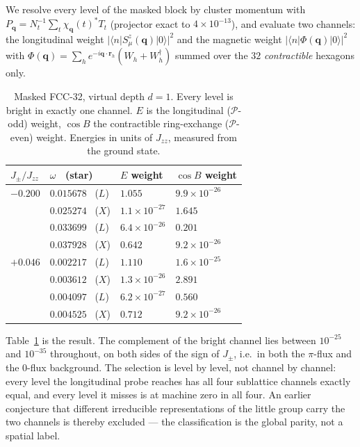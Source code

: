 \documentclass[aps,prl,preprint,amsmath,amssymb,superscriptaddress,
longbibliography,floatfix]{revtex4-2}
\newcommand{\Jzz}{J_{zz}}
\newcommand{\Jpm}{J_{\pm}}
\DeclareRobustCommand{\bq}{\bm q}
\DeclareRobustCommand{\br}{\bm r}
\newcommand{\PP}{\mathcal{P}}
\begin{document}
We resolve every level of the masked block by cluster momentum with
$P_{\bq}=N_t^{-1}\sum_t\chi_{\bq}(t)^*T_t$ (projector exact to
$4\times10^{-13}$), and evaluate two channels: the longitudinal weight
$|\langle n|S^z_\mu(\bq)|0\rangle|^2$ and the magnetic weight
$|\langle n|\Phi(\bq)|0\rangle|^2$ with
$\Phi(\bq)=\sum_he^{-i\bq\cdot\br_h}(W_h+W_h^\dagger)$ summed over the $32$
\emph{contractible} hexagons only.

\begin{table}[t]
\caption{Masked FCC-32, virtual depth $d=1$.  Every level is bright in exactly
one channel.  $E$ is the longitudinal ($\PP$-odd) weight, $\cos B$ the
contractible ring-exchange ($\PP$-even) weight.  Energies in units of $\Jzz$,
measured from the ground state.}
\label{tab:levels}
\begin{ruledtabular}
\begin{tabular}{llll}
$\Jpm/\Jzz$ & $\omega$ \ (star) & $E$ weight & $\cos B$ weight\\ \hline
$-0.200$ & $0.015678$ \ ($L$) & $1.055$              & $9.9\times10^{-26}$\\
         & $0.025274$ \ ($X$) & $1.1\times10^{-27}$  & $1.645$\\
         & $0.033699$ \ ($L$) & $6.4\times10^{-26}$  & $0.201$\\
         & $0.037928$ \ ($X$) & $0.642$              & $9.2\times10^{-26}$\\ \hline
$+0.046$ & $0.002217$ \ ($L$) & $1.110$              & $1.6\times10^{-25}$\\
         & $0.003612$ \ ($X$) & $1.3\times10^{-26}$  & $2.891$\\
         & $0.004097$ \ ($L$) & $6.2\times10^{-27}$  & $0.560$\\
         & $0.004525$ \ ($X$) & $0.712$              & $9.2\times10^{-26}$\\
\end{tabular}
\end{ruledtabular}
\end{table}

Table~\ref{tab:levels} is the result.  The complement of the bright channel
lies between $10^{-25}$ and $10^{-35}$ throughout, on both sides of the sign of
$\Jpm$, i.e.\ in both the $\pi$-flux and the $0$-flux background.  The
selection is level by level, not channel by channel: every level the
longitudinal probe reaches has all four sublattice channels exactly equal, and
every level it misses is at machine zero in all four.  An earlier conjecture
that different irreducible representations of the little group carry the two
channels is thereby excluded --- the classification is the global parity, not a
spatial label.
\end{document}
